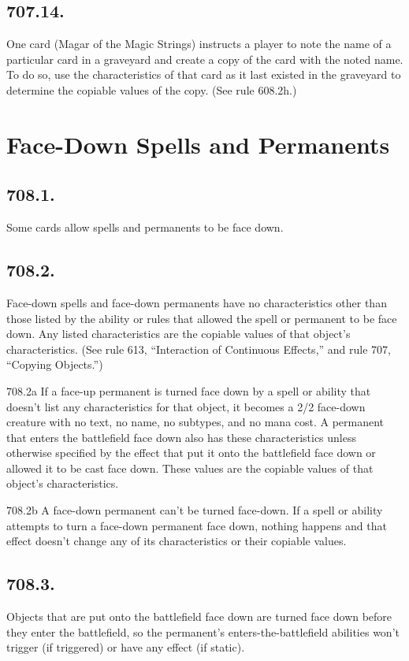 \subsection*{707.14.}
One card (Magar of the Magic Strings) instructs a player to note the name of a particular card in a graveyard and create a copy of the card with the noted name. To do so, use the characteristics of that card as it last existed in the graveyard to determine the copiable values of the copy. (See rule 608.2h.)

\section{Face-Down Spells and Permanents}
\subsection*{708.1.}
Some cards allow spells and permanents to be face down.

\subsection*{708.2.}
Face-down spells and face-down permanents have no characteristics other than those listed by the ability or rules that allowed the spell or permanent to be face down. Any listed characteristics are the copiable values of that object’s characteristics. (See rule 613, “Interaction of Continuous Effects,” and rule 707, “Copying Objects.”)

708.2a If a face-up permanent is turned face down by a spell or ability that doesn’t list any characteristics for that object, it becomes a 2/2 face-down creature with no text, no name, no subtypes, and no mana cost. A permanent that enters the battlefield face down also has these characteristics unless otherwise specified by the effect that put it onto the battlefield face down or allowed it to be cast face down. These values are the copiable values of that object’s characteristics.

708.2b A face-down permanent can’t be turned face-down. If a spell or ability attempts to turn a face-down permanent face down, nothing happens and that effect doesn’t change any of its characteristics or their copiable values.

\subsection*{708.3.}
Objects that are put onto the battlefield face down are turned face down before they enter the battlefield, so the permanent’s enters-the-battlefield abilities won’t trigger (if triggered) or have any effect (if static).

